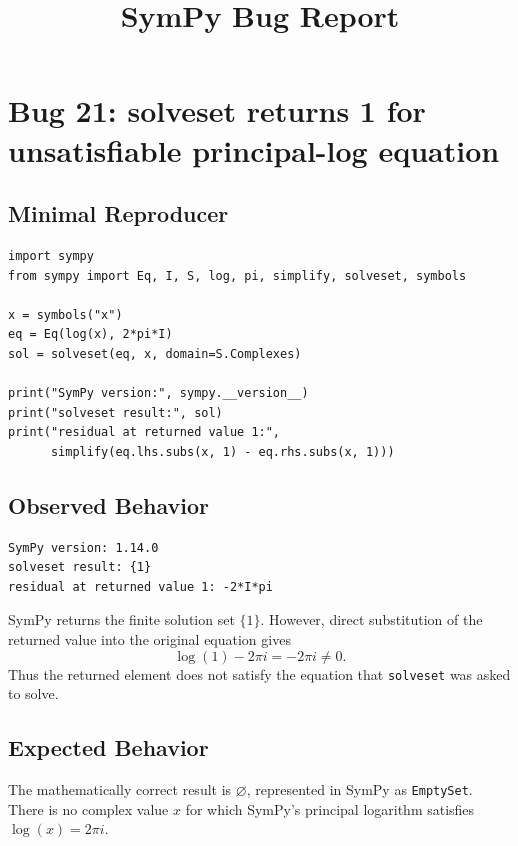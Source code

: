 \documentclass[11pt]{article}
\title{SymPy Bug Report}
\author{}
\date{}
\begin{document}
\maketitle

\section{Bug 21: solveset returns 1 for unsatisfiable principal-log equation}

\subsection{Minimal Reproducer}

\medskip

\begin{lstlisting}[style=bugpython]
import sympy
from sympy import Eq, I, S, log, pi, simplify, solveset, symbols

x = symbols("x")
eq = Eq(log(x), 2*pi*I)
sol = solveset(eq, x, domain=S.Complexes)

print("SymPy version:", sympy.__version__)
print("solveset result:", sol)
print("residual at returned value 1:",
      simplify(eq.lhs.subs(x, 1) - eq.rhs.subs(x, 1)))
\end{lstlisting}

\subsection{Observed Behavior}

\medskip

\begin{lstlisting}[style=bugpython]
SymPy version: 1.14.0
solveset result: {1}
residual at returned value 1: -2*I*pi
\end{lstlisting}

SymPy returns the finite solution set \(\{1\}\).  However, direct substitution
of the returned value into the original equation gives
\[
  \log(1) - 2\pi i = -2\pi i \ne 0.
\]
Thus the returned element does not satisfy the equation that \texttt{solveset}
was asked to solve.

\subsection{Expected Behavior}

The mathematically correct result is \(\varnothing\), represented in SymPy as
\texttt{EmptySet}.  There is no complex value \(x\) for which SymPy's principal
logarithm satisfies \(\log(x)=2\pi i\).
\end{document}
